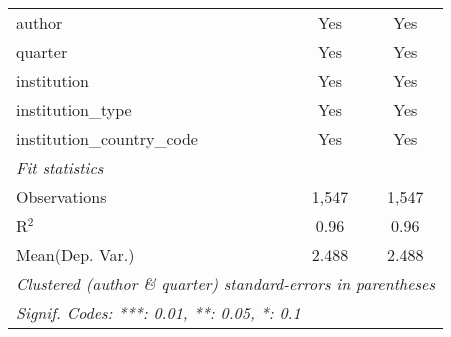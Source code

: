 \begin{tabular}{lcc}
   author                                   & Yes     & Yes\\  
   quarter                                  & Yes     & Yes\\  
   institution                              & Yes     & Yes\\  
   institution\_type                        & Yes     & Yes\\  
   institution\_country\_code               & Yes     & Yes\\  
   \midrule
   \emph{Fit statistics}\\
   Observations                             & 1,547   & 1,547\\  
   R$^2$                                    & 0.96    & 0.96\\  
Mean(Dep. Var.) & 2.488 & 2.488 \\
   \midrule \midrule
   \multicolumn{3}{l}{\emph{Clustered (author \& quarter) standard-errors in parentheses}}\\
   \multicolumn{3}{l}{\emph{Signif. Codes: ***: 0.01, **: 0.05, *: 0.1}}\\
\end{tabular}
\par\endgroup
